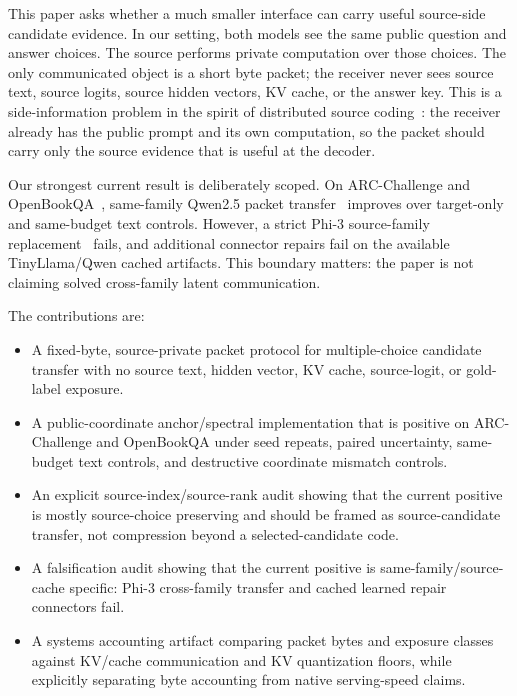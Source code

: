 \documentclass{article}
\newcommand{\arc}{ARC-Challenge}
\newcommand{\obqa}{OpenBookQA}
\begin{document}
This paper asks whether a much smaller interface can carry useful source-side candidate evidence. In our setting, both models see the same public question and answer choices. The source performs private computation over those choices. The only communicated object is a short byte packet; the receiver never sees source text, source logits, source hidden vectors, KV cache, or the answer key. This is a side-information problem in the spirit of distributed source coding~\citep{Slepian1973Noiseless,Wyner1976RateDistortion}: the receiver already has the public prompt and its own computation, so the packet should carry only the source evidence that is useful at the decoder.

Our strongest current result is deliberately scoped. On \arc{} and \obqa{}~\citep{Clark2018ARC,Mihaylov2018OpenBookQA}, same-family Qwen2.5 packet transfer~\citep{Yang2025Qwen25} improves over target-only and same-budget text controls. However, a strict Phi-3 source-family replacement~\citep{Abdin2024Phi3} fails, and additional connector repairs fail on the available TinyLlama/Qwen cached artifacts. This boundary matters: the paper is not claiming solved cross-family latent communication.

The contributions are:
\begin{itemize}
\item A fixed-byte, source-private packet protocol for multiple-choice candidate transfer with no source text, hidden vector, KV cache, source-logit, or gold-label exposure.
\item A public-coordinate anchor/spectral implementation that is positive on \arc{} and \obqa{} under seed repeats, paired uncertainty, same-budget text controls, and destructive coordinate mismatch controls.
\item An explicit source-index/source-rank audit showing that the current positive is mostly source-choice preserving and should be framed as source-candidate transfer, not compression beyond a selected-candidate code.
\item A falsification audit showing that the current positive is same-family/source-cache specific: Phi-3 cross-family transfer and cached learned repair connectors fail.
\item A systems accounting artifact comparing packet bytes and exposure classes against KV/cache communication and KV quantization floors, while explicitly separating byte accounting from native serving-speed claims.
\end{itemize}
\end{document}
